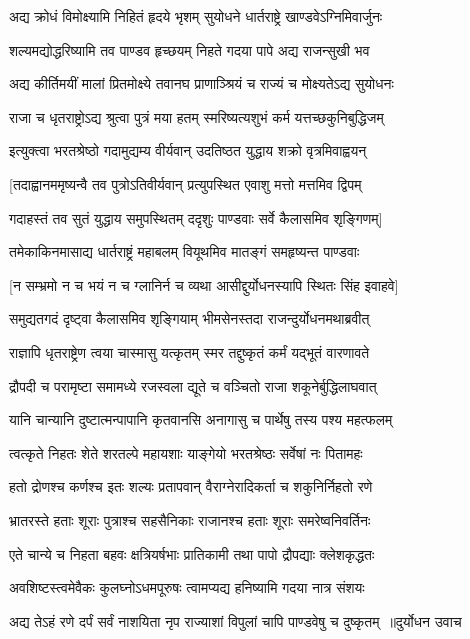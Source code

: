 \twolineshloka
{अद्य क्रोधं विमोक्ष्यामि निहितं हृदये भृशम्}
{सुयोधने धार्तराष्ट्रे खाण्डवेऽग्निमिवार्जुनः}


\twolineshloka
{शल्यमद्योद्धरिष्यामि तव पाण्डव हृच्छयम्}
{निहते गदया पापे अद्य राजन्सुखी भव}


\twolineshloka
{अद्य कीर्तिमयीं मालां प्रितमोक्ष्ये तवानघ}
{प्राणाञ्श्रियं च राज्यं च मोक्ष्यतेऽद्य सुयोधनः}


\twolineshloka
{राजा च धृतराष्ट्रोऽद्य श्रुत्वा पुत्रं मया हतम्}
{स्मरिष्यत्यशुभं कर्म यत्तच्छकुनिबुद्धिजम्}


\twolineshloka
{इत्युक्त्वा भरतश्रेष्ठो गदामुद्यम्य वीर्यवान्}
{उदतिष्ठत युद्धाय शक्रो वृत्रमिवाह्वयन्}


\twolineshloka
{[तदाह्वानममृष्यन्वै तव पुत्रोऽतिवीर्यवान्}
{प्रत्युपस्थित एवाशु मत्तो मत्तमिव द्विपम्}


\twolineshloka
{गदाहस्तं तव सुतं युद्धाय समुपस्थितम्}
{ददृशुः पाण्डवाः सर्वे कैलासमिव शृङ्गिणम्]}


\twolineshloka
{तमेकाकिनमासाद्य धार्तराष्ट्रं महाबलम्}
{वियूथमिव मातङ्गं समहृष्यन्त पाण्डवाः}


\twolineshloka
{[न सम्भ्रमो न च भयं न च ग्लानिर्न च व्यथा}
{आसीद्दुर्योधनस्यापि स्थितः सिंह इवाहवे]}


\twolineshloka
{समुद्यतगदं दृष्ट्वा कैलासमिव शृङ्गियाम्}
{भीमसेनस्तदा राजन्दुर्योधनमथाब्रवीत्}


\threelineshloka
{राज्ञापि धृतराष्ट्रेण त्वया चास्मासु यत्कृतम्}
{स्मर तद्दुष्कृतं कर्मं यद्भूतं वारणावते}
{}


\twolineshloka
{द्रौपदी च परामृष्टा समामध्ये रजस्वला}
{द्यूते च वञ्चितो राजा शकूनेर्बुद्धिलाघवात्}


\twolineshloka
{यानि चान्यानि दुष्टात्मन्पापानि कृतवानसि}
{अनागासु च पार्थेषु तस्य पश्य महत्फलम्}


\twolineshloka
{त्वत्कृते निहतः शेते शरतल्पे महायशाः}
{याङ्गेयो भरतश्रेष्ठः सर्वेषां नः पितामहः}


\twolineshloka
{हतो द्रोणश्च कर्णश्च इतः शल्यः प्रतापवान्}
{वैराग्नेरादिकर्ता च शकुनिर्निहतो रणे}


\twolineshloka
{भ्रातरस्ते हताः शूराः पुत्राश्च सहसैनिकाः}
{राजानश्च हताः शूराः समरेष्वनिवर्तिनः}


\twolineshloka
{एते चान्ये च निहता बहवः क्षत्रियर्षभाः}
{प्रातिकामी तथा पापो द्रौपद्याः क्लेशकृद्धतः}


\twolineshloka
{अवशिष्टस्त्वमेवैकः कुलघ्नोऽधमपूरुषः}
{त्वामप्यद्य हनिष्यामि गदया नात्र संशयः}


\threelineshloka
{अद्य तेऽहं रणे दर्पं सर्वं नाशयिता नृप}
{राज्याशां विपुलां चापि पाण्डवेषु च दुष्कृतम् ॥दुर्योधन उवाच}
{}


